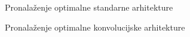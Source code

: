 \documentclass[pdf]{beamer}
\begin{document}
\begin{frame}{Pronalaženje optimalne standarne arhitekture}

\begin{figure}
\begin{center}
    \resizebox{.9\linewidth}{!}{}
\end{center}
\end{figure}

\end{frame}

\begin{frame}{Pronalaženje optimalne konvolucijske arhitekture}

\begin{figure}
\begin{center}
    \resizebox{.9\linewidth}{!}{}
\end{center}
\end{figure}

\end{frame}
\end{document}
